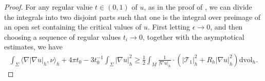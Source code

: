\documentclass[letter]{amsart}
\theoremstyle{definition}
\theoremstyle{remark}
\begin{document}
\begin{proof}

For any regular value $t \in (0, 1)$ of $u$, as in the proof of \cite[Theorem 1.2]{BKKS'22}, we can divide the integrals into two disjoint parts such that one is the integral over preimage of an open set containing the critical values of $u$. First letting $\epsilon \to 0$, and then choosing a sequence of regular values $t_i \to 0$, together with the asymptotical estimates, we have
\begin{align*}
	\int_{\Sigma } \langle \nabla |\nabla u|_h, \nu  \rangle_h + 4 \pi t_0 - 3 t_0^{-1} \int_{\Sigma }|\nabla u|_h^2 \geq \frac{1}{2} \int_{M} \frac{1}{|\nabla u|_h} \cdot \left( |\mathcal{T}_1|_h^2 + R_h |\nabla u|_h^2 \right) \mathrm{dvol}_h.
\end{align*}


\end{proof}
\end{document}

